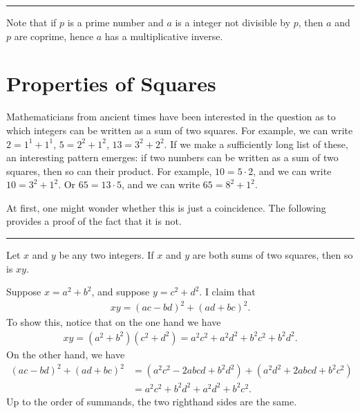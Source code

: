 \documentclass[letterpaper,10pt,english]{sphinxmanual}
\begin{document}
\bigskip\hrule\bigskip


\sphinxAtStartPar
Note that if \(p\) is a prime number and \(a\) is a integer not divisible by \(p\), then \(a\) and \(p\) are coprime, hence \(a\) has a multiplicative inverse.


\section{Properties of Squares}
\label{\detokenize{elementary_number_theory:properties-of-squares}}
\sphinxAtStartPar
Mathematicians from ancient times have been interested in the question as to which integers can be written as a sum of two squares. For example, we can write \(2 = 1^1 + 1^1\), \(5 = 2^2 + 1^2\), \(13 = 3^2 + 2^2\). If we make a sufficiently long list of these, an interesting pattern emerges: if two numbers can be written as a sum of two squares, then so can their product. For example, \(10 = 5 \cdot 2\), and we can write \(10 = 3^2 + 1^2\). Or \(65 = 13 \cdot 5\), and we can write \(65 = 8^2 + 1^2\).

\sphinxAtStartPar
At first, one might wonder whether this is just a coincidence. The following provides a proof of the fact that it is not.


\bigskip\hrule\bigskip


\sphinxAtStartPar
{} Let \(x\) and \(y\) be any two integers. If \(x\) and \(y\) are both sums of two squares, then so is \(x y\).

\sphinxAtStartPar
{} Suppose \(x = a^2 + b^2\), and suppose \(y = c^2 + d^2\). I claim that
\begin{equation*}
\begin{split}xy = (ac - bd)^2 + (ad + bc)^2.\end{split}
\end{equation*}
\sphinxAtStartPar
To show this, notice that on the one hand we have
\begin{equation*}
\begin{split}xy = (a^2 + b^2) (c^2 + d^2) = a^2 c^2 + a^2 d^2 + b^2 c^2 + b^2 d^2.\end{split}
\end{equation*}
\sphinxAtStartPar
On the other hand, we have
\begin{equation*}
\begin{split}(ac - bd)^2 + (ad + bc)^2 & = (a^2c^2 - 2abcd + b^2 d^2) + (a^2 d^2 + 2 a b c d + b^2 c^2) \\
 & = a^2 c^2 + b^2 d^2 + a^2 d^2 + b^2 c^2.\end{split}
\end{equation*}
\sphinxAtStartPar
Up to the order of summands, the two right\sphinxhyphen{}hand sides are the same.
\end{document}
